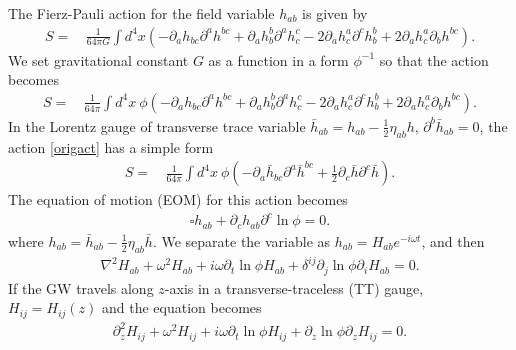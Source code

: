 \documentclass[
    jor,
    amsmath,amssymb,preprint,
    superscriptaddress,
]{revtex4-2}
\begin{document}
The Fierz-Pauli action for the field variable $h_{ab}$ is given by~\cite{Roy2020}
\begin{equation}
\begin{aligned}
S = & \,\frac{1}{64 \pi G} \int d^4 x\left(-\partial_a h_{b c} \partial^a h^{b c}+\partial_a h_b^b \partial^a h_c^c-2 \partial_a h_c^a \partial^c h_b^b+2 \partial_a h_c^a \partial_b h^{b c}\right).
\end{aligned}
\end{equation}
We set gravitational constant $G$ as a function in a form $\phi^{-1}$ so that the action becomes
\begin{equation}
\begin{aligned}
S = & \,\frac{1}{64 \pi} \int d^4 x~\phi\left(-\partial_a h_{b c} \partial^a h^{b c}+\partial_a h_b^b \partial^a h_c^c-2 \partial_a h_c^a \partial^c h_b^b+2 \partial_a h_c^a \partial_b h^{b c}\right). \label{origact}
\end{aligned}
\end{equation}
In the Lorentz gauge of transverse trace variable $\bar{h}_{ab} = h_{ab} - \frac{1}{2}\eta_{ab}h$, $\partial^b \bar{h}_{ab} = 0$, the action \eqref{origact} has a simple form
\begin{equation}
\begin{aligned}
S = & \,\frac{1}{64 \pi} \int d^4 x~\phi \left( -\partial_a\bar{h}_{bc}\partial^a\bar{h}^{bc} + \frac{1}{2}\partial_c\bar{h}\partial^c\bar{h} \right).
\end{aligned}
\end{equation}
The equation of motion (EOM) for this action becomes
\begin{align}
\square h_{ab} + \partial_ch_{ab}\partial^c\ln\phi = 0. \label{fereom}
\end{align}
where $h_{ab} = \bar{h}_{ab} - \frac{1}{2} \eta_{ab}\bar{h}$. We separate the variable as $h_{ab} = H_{ab}e^{-i\omega t}$, and then
\begin{equation}
\begin{aligned}
\nabla^2 H_{ab} + \omega^2 H_{ab} + i\omega \partial_t\ln \phi H_{ab} + \delta^{ij} \partial_j\ln \phi \partial_iH_{ab} = 0.
\end{aligned}
\end{equation}
If the GW travels along $z$-axis in a transverse-traceless (TT) gauge, $H_{ij} = H_{ij}(z)$ and the equation becomes
\begin{align}
\partial_z^2 H_{ij} + \omega^2 H_{ij} + i\omega \partial_t\ln \phi H_{ij} + \partial_z\ln \phi \partial_zH_{ij} = 0. \label{ferorg}
\end{align}
\end{document}
